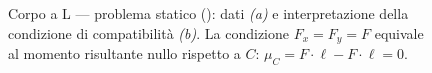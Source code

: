 \begin{figure}[ht]
		\caption{Corpo a L --- problema statico
			():
			dati \emph{(a)} e interpretazione della
			condizione di compatibilità \emph{(b)}.
			La condizione $F_x = F_y = F$ equivale
			al momento risultante nullo rispetto a $C$:
			$\mu_C = F\cdot\ell - F\cdot\ell = 0$.}
		\label{fig:labile_L_stat}
	\end{figure}
